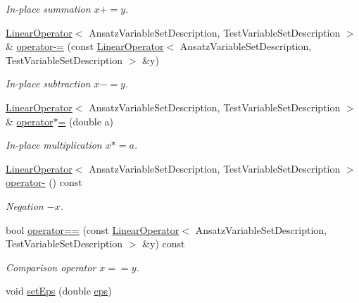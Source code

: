 \begin{DoxyCompactItemize}
\begin{DoxyCompactList}\small\item\em In-\/place summation $ x+=y$. \end{DoxyCompactList}\item 
\hyperlink{classSpacy_1_1Kaskade_1_1LinearOperator}{Linear\+Operator}$<$ Ansatz\+Variable\+Set\+Description, Test\+Variable\+Set\+Description $>$ \& \hyperlink{classSpacy_1_1SupportedOperatorBase_af21496412c35e4afa59779b4fe1b67d5_af21496412c35e4afa59779b4fe1b67d5}{operator-\/=} (const \hyperlink{classSpacy_1_1Kaskade_1_1LinearOperator}{Linear\+Operator}$<$ Ansatz\+Variable\+Set\+Description, Test\+Variable\+Set\+Description $>$ \&y)
\begin{DoxyCompactList}\small\item\em In-\/place subtraction $ x-=y$. \end{DoxyCompactList}\item 
\hyperlink{classSpacy_1_1Kaskade_1_1LinearOperator}{Linear\+Operator}$<$ Ansatz\+Variable\+Set\+Description, Test\+Variable\+Set\+Description $>$ \& \hyperlink{classSpacy_1_1SupportedOperatorBase_a15adabb20b53d84a79982b0668a67f68_a15adabb20b53d84a79982b0668a67f68}{operator$\ast$=} (double a)
\begin{DoxyCompactList}\small\item\em In-\/place multiplication $ x*=a$. \end{DoxyCompactList}\item 
\hyperlink{classSpacy_1_1Kaskade_1_1LinearOperator}{Linear\+Operator}$<$ Ansatz\+Variable\+Set\+Description, Test\+Variable\+Set\+Description $>$ \hyperlink{classSpacy_1_1SupportedOperatorBase_a0adcaddc24efbbdccbd891df99971c6c_a0adcaddc24efbbdccbd891df99971c6c}{operator-\/} () const
\begin{DoxyCompactList}\small\item\em Negation $ -x$. \end{DoxyCompactList}\item 
bool \hyperlink{classSpacy_1_1SupportedOperatorBase_aa493a6ea82feb3480a1c83395a0a7c3a_aa493a6ea82feb3480a1c83395a0a7c3a}{operator==} (const \hyperlink{classSpacy_1_1Kaskade_1_1LinearOperator}{Linear\+Operator}$<$ Ansatz\+Variable\+Set\+Description, Test\+Variable\+Set\+Description $>$ \&y) const
\begin{DoxyCompactList}\small\item\em Comparison operator $ x==y$. \end{DoxyCompactList}\item 
void \hyperlink{classSpacy_1_1Mixin_1_1Eps_a1bbfd62541610d5d80f2782ab77158e4_a1bbfd62541610d5d80f2782ab77158e4}{set\+Eps} (double \hyperlink{classSpacy_1_1Mixin_1_1Eps_a40e2ba8f3abd2b5370ef41238cfaaf8b_a40e2ba8f3abd2b5370ef41238cfaaf8b}{eps})

\end{DoxyCompactItemize}
